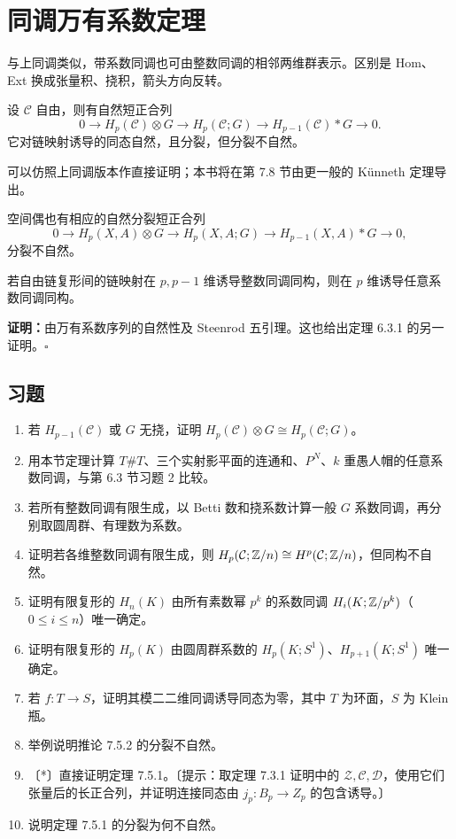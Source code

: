 \section{同调万有系数定理}
与上同调类似，带系数同调也可由整数同调的相邻两维群表示。区别是 Hom、Ext 换成张量积、挠积，箭头方向反转。

设 $\mathcal C$ 自由，则有自然短正合列
\[
0\to H_p(\mathcal C)\otimes G\to H_p(\mathcal C;G)\to H_{p-1}(\mathcal C)*G\to0.
\]
它对链映射诱导的同态自然，且分裂，但分裂不自然。

可以仿照上同调版本作直接证明；本书将在第 7.8 节由更一般的 Künneth 定理导出。

空间偶也有相应的自然分裂短正合列
\[
0\to H_p(X,A)\otimes G\to H_p(X,A;G)\to H_{p-1}(X,A)*G\to0,
\]
分裂不自然。

若自由链复形间的链映射在 $p,p-1$ 维诱导整数同调同构，则在 $p$ 维诱导任意系数同调同构。

\textbf{证明：}由万有系数序列的自然性及 Steenrod 五引理。这也给出定理 6.3.1 的另一证明。\hfill$\square$

\subsection*{习题}
\begin{enumerate}
\item 若 $H_{p-1}(\mathcal C)$ 或 $G$ 无挠，证明 $H_p(\mathcal C)\otimes G\cong H_p(\mathcal C;G)$。
\item 用本节定理计算 $T\#T$、三个实射影平面的连通和、$P^N$、$k$ 重愚人帽的任意系数同调，与第 6.3 节习题 2 比较。
\item 若所有整数同调有限生成，以 Betti 数和挠系数计算一般 $G$ 系数同调，再分别取圆周群、有理数为系数。
\item 证明若各维整数同调有限生成，则 $H_p(\mathcal C;\mathbb{Z}/n)\cong H^p(\mathcal C;\mathbb{Z}/n)$，但同构不自然。
\item 证明有限复形的 $H_n(K)$ 由所有素数幂 $p^k$ 的系数同调 $H_i(K;\mathbb{Z}/p^k)$（$0\le i\le n$）唯一确定。
\item 证明有限复形的 $H_p(K)$ 由圆周群系数的 $H_p(K;S^1)$、$H_{p+1}(K;S^1)$ 唯一确定。
\item 若 $f:T\to S$，证明其模二二维同调诱导同态为零，其中 $T$ 为环面，$S$ 为 Klein 瓶。
\item 举例说明推论 7.5.2 的分裂不自然。
\item 〔*〕直接证明定理 7.5.1。〔提示：取定理 7.3.1 证明中的 $\mathcal Z,\mathcal C,\mathcal D$，使用它们张量后的长正合列，并证明连接同态由 $j_p:B_p\to Z_p$ 的包含诱导。〕
\item 说明定理 7.5.1 的分裂为何不自然。
\end{enumerate}
